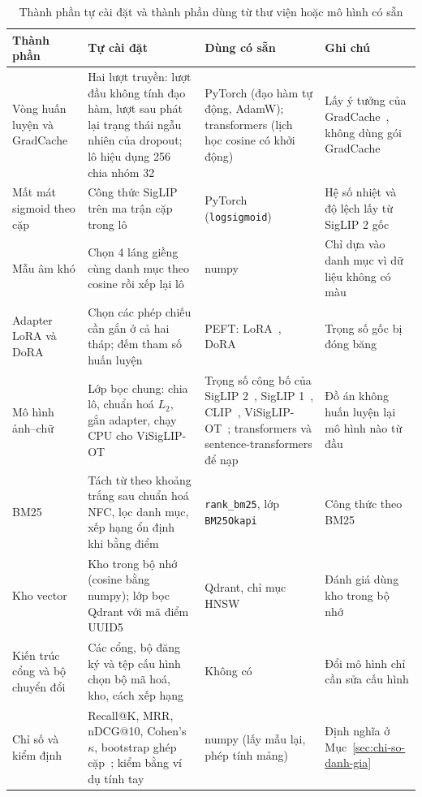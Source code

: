 \begin{table}[H]
\centering
\caption{Thành phần tự cài đặt và thành phần dùng từ thư viện hoặc mô hình có sẵn}
\label{tab:c4_tucai}
\footnotesize
\renewcommand{\arraystretch}{1.1}
\begin{tabularx}{\textwidth}{@{}>{\raggedright\arraybackslash}p{2.6cm} Y Y Y@{}}
\toprule
\textbf{Thành phần} & \textbf{Tự cài đặt} & \textbf{Dùng có sẵn} & \textbf{Ghi chú} \\
\midrule
Vòng huấn luyện và GradCache & Hai lượt truyền: lượt đầu không tính đạo hàm, lượt sau phát lại trạng thái ngẫu nhiên của dropout; lô hiệu dụng 256 chia nhóm 32 & PyTorch (đạo hàm tự động, AdamW); transformers (lịch học cosine có khởi động) & Lấy ý tưởng của GradCache~\cite{gao2021gradcache}, không dùng gói GradCache \\
Mất mát sigmoid theo cặp & Công thức SigLIP trên ma trận cặp trong lô & PyTorch (\texttt{logsigmoid}) & Hệ số nhiệt và độ lệch lấy từ SigLIP 2 gốc \\
Mẫu âm khó & Chọn 4 láng giềng cùng danh mục theo cosine rồi xếp lại lô & numpy & Chỉ dựa vào danh mục vì dữ liệu không có màu \\
Adapter LoRA và DoRA & Chọn các phép chiếu cần gắn ở cả hai tháp; đếm tham số huấn luyện & PEFT: LoRA~\cite{hu2022lora}, DoRA~\cite{liu2024dora} & Trọng số gốc bị đóng băng \\
Mô hình ảnh--chữ & Lớp bọc chung: chia lô, chuẩn hoá $L_2$, gắn adapter, chạy CPU cho ViSigLIP-OT & Trọng số công bố của SigLIP 2~\cite{tschannen2025siglip2}, SigLIP 1~\cite{zhai2023siglip}, CLIP~\cite{radford2021clip}, ViSigLIP-OT~\cite{viclipot2026}; transformers và sentence-transformers để nạp & Đồ án không huấn luyện lại mô hình nào từ đầu \\
BM25 & Tách từ theo khoảng trắng sau chuẩn hoá NFC, lọc danh mục, xếp hạng ổn định khi bằng điểm & \texttt{rank\_bm25}, lớp \texttt{BM25Okapi} & Công thức theo BM25~\cite{robertson2009bm25} \\
Kho vector & Kho trong bộ nhớ (cosine bằng numpy); lớp bọc Qdrant với mã điểm UUID5 & Qdrant, chỉ mục HNSW~\cite{malkov2020hnsw} & Đánh giá dùng kho trong bộ nhớ \\
Kiến trúc cổng và bộ chuyển đổi & Các cổng, bộ đăng ký và tệp cấu hình chọn bộ mã hoá, kho, cách xếp hạng & Không có & Đổi mô hình chỉ cần sửa cấu hình \\
Chỉ số và kiểm định & Recall@K, MRR, nDCG@10, Cohen's $\kappa$, bootstrap ghép cặp~\cite{efron1993bootstrap}; kiểm bằng ví dụ tính tay & numpy (lấy mẫu lại, phép tính mảng) & Định nghĩa ở Mục~\ref{sec:chi-so-danh-gia} \\

\end{tabularx}
\end{table}

